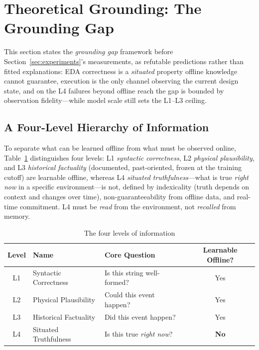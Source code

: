 \section{Theoretical Grounding: The Grounding Gap}
\label{sec:grounding-theory}

This section states the \emph{grounding gap} framework before Section~\ref{sec:experiments}'s measurements, as refutable predictions rather than fitted explanations: EDA correctness is a \emph{situated} property offline knowledge cannot guarantee, execution is the only channel observing the current design state, and on the L4 failures beyond offline reach the gap is bounded by observation fidelity---while model scale still sets the L1--L3 ceiling.

\subsection{A Four-Level Hierarchy of Information}
\label{sec:four-levels}

To separate what can be learned offline from what must be observed online, Table~\ref{tab:four-levels} distinguishes four levels: L1 \emph{syntactic correctness}, L2 \emph{physical plausibility}, and L3 \emph{historical factuality} (documented, past-oriented, frozen at the training cutoff) are learnable offline, whereas L4 \emph{situated truthfulness}---what is true \emph{right now} in a specific environment---is not, defined by indexicality (truth depends on context and changes over time), non-guaranteeability from offline data, and real-time commitment. L4 must be \emph{read} from the environment, not \emph{recalled} from memory.

\begin{table}[htbp]
\centering
\caption{The four levels of information}
\label{tab:four-levels}
\begin{tabular}{clp{5.2cm}c}
\toprule
\textbf{Level} & \textbf{Name} & \textbf{Core Question} & \textbf{Learnable Offline?} \\
\midrule
L1 & Syntactic Correctness & Is this string well-formed? & Yes \\
L2 & Physical Plausibility & Could this event happen? & Yes \\
L3 & Historical Factuality & Did this event happen? & Yes \\
L4 & Situated Truthfulness & Is this true \emph{right now}? & \textbf{No} \\
\bottomrule
\end{tabular}
\end{table}

